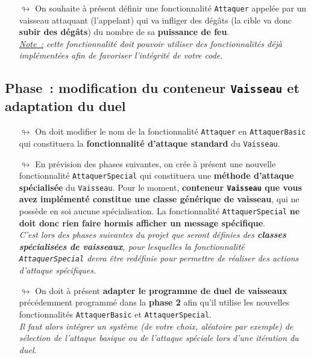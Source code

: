 \documentclass[10pt, fleqn, a4paper]{article}
\newcommand{\bfcolor}[2]{\textcolor{#1}{\textbf{#2}}}
\newcommand{\itcolor}[2]{\textcolor{#1}{\textit{#2}}}
\newcounter{quest}
\begin{document}
\begin{itemize}
\item[$\looparrowright$] On souhaite à présent définir une fonctionnalité \texttt{Attaquer} \og{}appelée par un vaisseau attaquant (l'appelant)\fg{} qui va infliger des dégâts (la cible va donc \textbf{subir des dégâts}) du nombre de sa \textbf{puissance de feu}.\\
\itcolor{redCM}{\underline{Note~:} cette fonctionnalité doit pouvoir utiliser des fonctionnalités déjà implémentées afin de favoriser l'intégrité de votre code.} 
\end{itemize}

\addtocounter{quest}{1}
\subsection*{Phase~\thequest : modification du conteneur \texttt{Vaisseau} et adaptation du duel}
\label{phase_type_vaisseau}

\begin{itemize}
\item[$\looparrowright$] On doit modifier le nom de la fonctionnalité \texttt{Attaquer} en \texttt{AttaquerBasic} qui constituera la \bfcolor{blueTD}{fonctionnalité d'attaque standard} du \texttt{Vaisseau}.
\item[$\looparrowright$] En prévision des phases suivantes, on crée à présent une nouvelle fonctionnalité \texttt{AttaquerSpecial} qui constituera une \bfcolor{blueTD}{méthode d'attaque spécialisée} du \texttt{Vaisseau}. Pour le moment, \bfcolor{blueTD}{conteneur \texttt{Vaisseau} que vous avez implémenté constitue une classe générique de vaisseau}, qui ne possède en soi aucune spécialisation. La fonctionnalité \texttt{AttaquerSpecial} \bfcolor{blueTD}{ne doit donc rien faire hormis afficher un message spécifique}.\\
\itcolor{redCM}{C'est lors des phases suivantes du projet que seront définies des \textbf{classes spécialisées de vaisseaux}, pour lesquelles la fonctionnalité \textnormal{\texttt{AttaquerSpecial}} devra être redéfinie pour permettre de réaliser des actions d'attaque spécifiques.} 
\item[$\looparrowright$] On doit à présent \bfcolor{greenTP}{adapter le programme de duel de vaisseaux} précédemment programmé dans la \bfcolor{greenTP}{phase 2} afin qu'il utilise les nouvelles fonctionnalités \textnormal{\texttt{AttaquerBasic}} et \textnormal{\texttt{AttaquerSpecial}}.\\
\itcolor{redCM}{Il faut alors intégrer un système (de votre choix, aléatoire par exemple) de sélection de l'attaque basique ou de l'attaque spéciale lors d'une itération du duel.}
\end{itemize}
\end{document}
